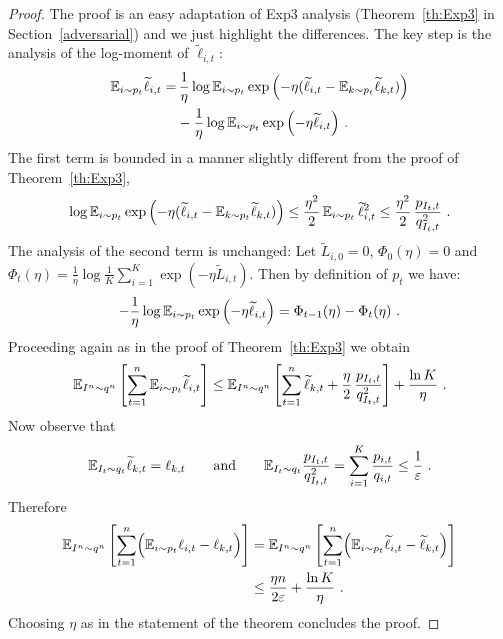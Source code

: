 \begin{proof}
The proof is an easy adaptation of Exp3 analysis (Theorem~\ref{th:Exp3} in Section~\ref{adversarial}) and we just highlight the differences.
The key step is the analysis of the log-moment of $\tilde{\ell}_{i,t}$:
\begin{align*}
    \mathbb{E}_{i \sim p_t} \widetilde{\ell}_{i,t} =&\, \frac{1}{\eta} \log \mathbb{E}_{i \sim p_t} \exp{\left(- \eta (\widetilde{\ell}_{i,t} - \mathbb{E}_{k \sim p_t} \widetilde{\ell}_{k,t}) \right)}
\\ &-
    \frac{1}{\eta} \log \mathbb{E}_{i \sim p_t} \exp{\left(- \eta \widetilde{\ell}_{i,t} \right)}~.
\end{align*}
The first term is bounded in a manner slightly different from the proof of Theorem~\ref{th:Exp3},
\[
    \log \mathbb{E}_{i \sim p_t} \exp{\left(- \eta (\widetilde{\ell}_{i,t} - \mathbb{E}_{k \sim p_t} \widetilde{\ell}_{k,t}) \right)} 
\le
    \frac{\eta^2}{2}\,\mathbb{E}_{i \sim p_t}\,\widetilde{\ell}_{i,t}^2
\le
    \frac{\eta^2}{2}\,\frac{p_{I_t,t}}{q_{I_t,t}^2}~.
\]
The analysis of the second term is unchanged:
Let $\tilde{L}_{i,0}=0$, $\Phi_0(\eta)=0$ and $\Phi_t(\eta) = \frac{1}{\eta} \log \frac{1}{K} \sum_{i=1}^K \exp{\left(- \eta \tilde{L}_{i,t}\right)}$. Then by definition of $p_t$ we have:
\[
    - \frac{1}{\eta} \log \mathbb{E}_{i \sim p_t} \exp{\left(- \eta \widetilde{\ell}_{i,t} \right)} 
=
    \Phi_{t-1}(\eta) - \Phi_{t}(\eta)~.
\]
Proceeding again as in the proof of Theorem~\ref{th:Exp3} we obtain
\begin{align*}
    \mathbb{E}_{I^n \sim q^n}\left[\sum_{t=1}^n \mathbb{E}_{i \sim p_t} \widetilde{\ell}_{i,t}\right]
\le
    \mathbb{E}_{I^n \sim q^n}\left[\sum_{t=1}^n \widetilde{\ell}_{k,t} + \frac{\eta}{2}\,\frac{p_{I_t,t}}{q_{I_t,t}^2} \right] + \frac{\ln K}{\eta}~.
\end{align*}
Now observe that
\begin{align*}
    \mathbb{E}_{I_t \sim q_t} \widetilde{\ell}_{k,t} = \ell_{k,t}
\qquad\text{and}\qquad
    \mathbb{E}_{I_t \sim q_t} \frac{p_{I_t,t}}{q_{I_t,t}^2} = \sum_{i=1}^K \frac{p_{i,t}}{q_{i,t}} \le \frac{1}{\varepsilon}~.
\end{align*}
Therefore
\begin{align*}
    \mathbb{E}_{I^n \sim q^n}\left[\sum_{t=1}^n \Bigl( \mathbb{E}_{i \sim p_t} \ell_{i,t} - \ell_{k,t} \Bigr) \right]
&=
    \mathbb{E}_{I^n \sim q^n}\left[\sum_{t=1}^n \Bigl( \mathbb{E}_{i \sim p_t} \widetilde{\ell}_{i,t} - \widetilde{\ell}_{k,t} \Bigr) \right]
\\ &\le
    \frac{\eta n}{2\varepsilon} + \frac{\ln K}{\eta}~.
\end{align*}
Choosing $\eta$ as in the statement of the theorem concludes the proof.
\end{proof}
